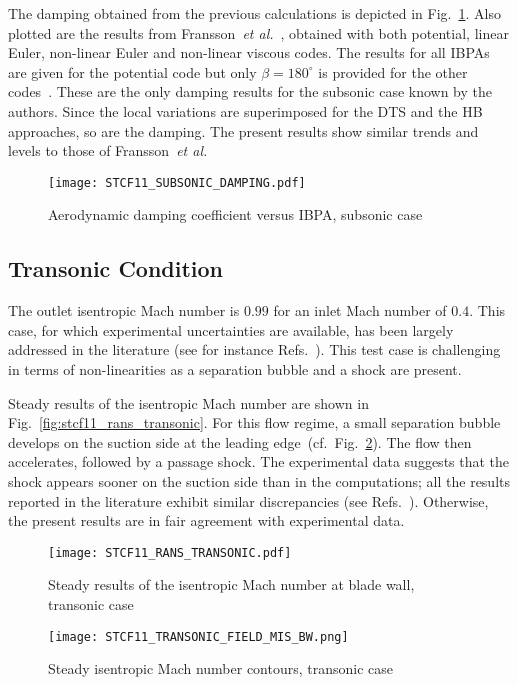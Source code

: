 The damping obtained from the previous calculations is depicted 
in Fig.~\ref{fig:stcf11_subsonic_damping}.  Also plotted are the results
from Fransson~\emph{et al.}~\cite{Fransson:1999uq}, obtained with both
potential, linear Euler, non-linear Euler and non-linear viscous codes.
The results for all IBPAs are given for the potential code but only $\beta=180^\circ$ is provided for the other codes~\cite{Fransson:1999uq}.
These are the only damping results for the
subsonic case known by the authors.  Since the local variations are
superimposed for the DTS and the HB approaches, so are the damping.
The present
results show similar trends and levels to those of Fransson~\emph{et al.} 
\begin{figure}[htb]
  \centering
  \texttt{[image: STCF11\_SUBSONIC\_DAMPING.pdf]}
  \caption{Aerodynamic damping coefficient versus IBPA, subsonic case}
  \label{fig:stcf11_subsonic_damping}
\end{figure}



\subsection{Transonic Condition}
The outlet isentropic Mach number is $0.99$ for an inlet Mach number of $0.4$. 
This case, for which experimental uncertainties are available, 
has been largely addressed in the literature 
(see for instance Refs.~\cite{Sbardella:2001fk,Duta:2002uq,Campobasso:2003fk,Cinnella2004}). 
This test case is challenging in terms of non-linearities as a separation bubble and a shock are present.

Steady results of the isentropic Mach number are shown in
Fig.~\ref{fig:stcf11_rans_transonic}.  For this flow regime,
a small separation
bubble develops on the suction side at the leading edge~(cf.~Fig.~\ref{fig:stcf11_transonic_field_mis_bw}).  The flow then accelerates, followed by a passage shock.  
The experimental data suggests that the shock appears
sooner on the suction side than in the computations; all the results 
reported in the literature exhibit similar discrepancies (see
Refs.~\cite{Fransson:1999uq,Sbardella:2001fk,Duta:2002uq,Campobasso:2003fk,Cinnella2004}). 
Otherwise, the present results are in fair agreement with experimental data.
\begin{figure}[htb]
  \centering
  \begin{minipage}[b]{.46\linewidth}
    \centering
    \texttt{[image: STCF11\_RANS\_TRANSONIC.pdf]}
    \caption{Steady results of the isentropic Mach number at blade
      wall, transonic case}
    \label{fig:stcf11_rans_transonic}
  \end{minipage}\quad
  \begin{minipage}[b]{.46\linewidth}
    \centering
    \texttt{[image: STCF11\_TRANSONIC\_FIELD\_MIS\_BW.png]}
    \caption{Steady isentropic Mach number contours, transonic case}
    \label{fig:stcf11_transonic_field_mis_bw}
  \end{minipage}
\end{figure}

